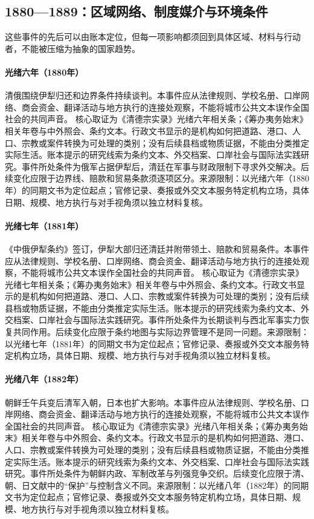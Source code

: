 \subsection{1880—1889：区域网络、制度媒介与环境条件}
这些事件的先后可以由账本定位，但每一项影响都须回到具体区域、材料与行动者，不能被压缩为抽象的国家趋势。
\hypertarget{civic:EQ-1880-ILI-NEGOTIATIONS}{}\paragraph{光绪六年（1880年）}清俄围绕伊犁归还和边界条件持续谈判。本事件应从法律规则、学校名册、口岸网络、商会资金、翻译活动与地方执行的连接处观察，不能将城市公共文本误作全国社会的共同声音。 核心取证为《清德宗实录》光绪六年相关条；《筹办夷务始末》相关年卷与中外照会、条约文本。行政文书显示的是机构如何把道路、港口、人口、宗教或案件转换为可处理的类别；没有后续县档或物质证据，不能由分类推定实际生活。账本提示的研究线索为条约文本、外交档案、口岸社会与国际法实践研究。事件所处条件为俄军占据伊犁后，清廷在军事与财政限制下寻求外交解决。后续变化应限于边界线、赔款和贸易条款须逐项区分。来源限制：以光绪六年（1880年）的同期文书为定位起点；官修记录、奏报或外交文本服务特定机构立场，具体日期、规模、地方执行与对手视角须以独立材料复核。
\hypertarget{civic:EQ-1881-SAINT-PETERSBURG-TREATY}{}\paragraph{光绪七年（1881年）}《中俄伊犁条约》签订，伊犁大部归还清廷并附带领土、赔款和贸易条件。本事件应从法律规则、学校名册、口岸网络、商会资金、翻译活动与地方执行的连接处观察，不能将城市公共文本误作全国社会的共同声音。 核心取证为《清德宗实录》光绪七年相关条；《筹办夷务始末》相关年卷与中外照会、条约文本。行政文书显示的是机构如何把道路、港口、人口、宗教或案件转换为可处理的类别；没有后续县档或物质证据，不能由分类推定实际生活。账本提示的研究线索为条约文本、外交档案、口岸社会与国际法实践研究。事件所处条件为长期谈判与西北军事实力恢复共同作用。后续变化应限于条约地图与实际边界管理不是同一问题。来源限制：以光绪七年（1881年）的同期文书为定位起点；官修记录、奏报或外交文本服务特定机构立场，具体日期、规模、地方执行与对手视角须以独立材料复核。
\hypertarget{civic:EQ-1882-IMO-INCIDENT}{}\paragraph{光绪八年（1882年）}朝鲜壬午兵变后清军入朝，日本也扩大影响。本事件应从法律规则、学校名册、口岸网络、商会资金、翻译活动与地方执行的连接处观察，不能将城市公共文本误作全国社会的共同声音。 核心取证为《清德宗实录》光绪八年相关条；《筹办夷务始末》相关年卷与中外照会、条约文本。行政文书显示的是机构如何把道路、港口、人口、宗教或案件转换为可处理的类别；没有后续县档或物质证据，不能由分类推定实际生活。账本提示的研究线索为条约文本、外交档案、口岸社会与国际法实践研究。事件所处条件为朝鲜内政、军制改革与列强竞争交织。后续变化应限于清、朝、日文献中的“保护”与控制含义不同。来源限制：以光绪八年（1882年）的同期文书为定位起点；官修记录、奏报或外交文本服务特定机构立场，具体日期、规模、地方执行与对手视角须以独立材料复核。
